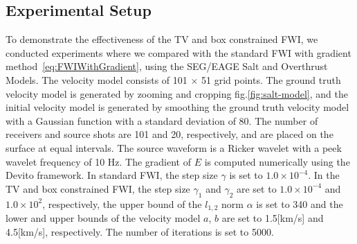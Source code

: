 \subsection{Experimental Setup}\label{subsec:experimental-setup}
%
%
%
To demonstrate the effectiveness of the TV and box constrained FWI, we conducted experiments where we compared with the standard FWI with gradient method~\eqref{eq:FWIWithGradient}, using the SEG/EAGE Salt and Overthrust Models.
The velocity model consists of 101 $\times$ 51 grid points.
The ground truth velocity model is generated by zooming and cropping fig.\ref{fig:salt-model}, and the initial velocity model is generated by smoothing the ground truth velocity model with a Gaussian function with a standard deviation of 80.
The number of receivers and source shots are 101 and 20, respectively, and are placed on the surface at equal intervals.
The source waveform is a Ricker wavelet with a peek wavelet frequency of 10 Hz.
The gradient of $E$ is computed numerically using the Devito framework\cite{devito}.
In standard FWI, the step size $\gamma$ is set to $1.0 \times 10^{-4}$.
In the TV and box constrained FWI, the step size $\gamma_1$ and $\gamma_2$ are set to $1.0 \times 10^{-4}$ and $1.0 \times 10^2$, respectively, the upper bound of the $l_{1,2}$ norm $\alpha$ is set to 340 and the lower and upper bounds of the velocity model $a$, $b$ are set to 1.5[km/s] and 4.5[km/s], respectively.
The number of iterations is set to 5000.


